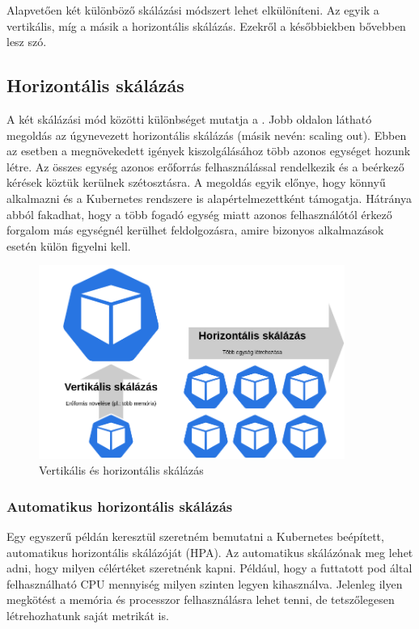 Alapvetően két különböző skálázási módszert lehet elkülöníteni. Az egyik a vertikális, míg a másik a horizontális skálázás. Ezekről a későbbiekben bővebben lesz szó. 

\subsection{Horizontális skálázás}
A két skálázási mód közötti különbséget mutatja a . 
Jobb oldalon látható megoldás az úgynevezett horizontális skálázás (másik nevén: scaling out). 
Ebben az esetben a megnövekedett igények kiszolgálásához több azonos egységet hozunk létre.
Az összes egység azonos erőforrás felhasználással rendelkezik és a beérkező kérések köztük kerülnek szétosztásra. 
A megoldás egyik előnye, hogy könnyű alkalmazni és a Kubernetes rendszere is alapértelmezettként támogatja.
Hátránya abból fakadhat, hogy a több fogadó egység miatt azonos felhasználótól érkező forgalom más egységnél kerülhet feldolgozásra, amire bizonyos alkalmazások esetén külön figyelni kell.

\begin{figure}[!ht]
\centering
\includegraphics[width=100mm, keepaspectratio]{figures/scaling_types.png}
\caption{Vertikális és horizontális skálázás}
\label{fig:scaling}
\end{figure}

\subsubsection{Automatikus horizontális skálázás}
\label{subsec:hpa}
Egy egyszerű példán keresztül szeretném bemutatni a Kubernetes beépített, automatikus horizontális skálázóját (HPA). Az automatikus skálázónak meg lehet adni, hogy milyen célértéket szeretnénk kapni. Például, hogy a futtatott pod által felhasználható CPU mennyiség milyen szinten legyen kihasználva. Jelenleg ilyen megkötést a memória és processzor felhasználásra lehet tenni, de tetszőlegesen létrehozhatunk saját metrikát is. 

